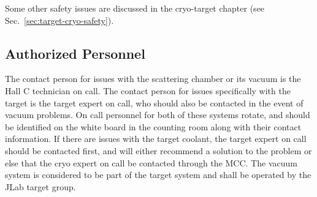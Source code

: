 {\begin{list}{.~}{\setlength{\itemsep}{-0.15cm}}
\end{list}

Some other safety issues are discussed in the cryo-target chapter (see
Sec.~\ref{sec:target-cryo-safety}).

\subsection[Authorized  Personnel]{Authorized  Personnel}

The contact person for issues with the scattering chamber or its
vacuum is the Hall C technician on call. The contact person for issues
specifically with the target is the target expert on call, who should
also be contacted in the event of vacuum problems.  On call personnel
for both of these systems rotate, and should be identified on the
white board in the counting room along with their contact information.
If there are issues with the target coolant, the target expert on call
should be contacted first, and will either recommend a solution to the
problem or else that the cryo expert on call be contacted through the
MCC. The vacuum system is considered to be part of the target system
and shall be operated by the JLab target group.

%
}

